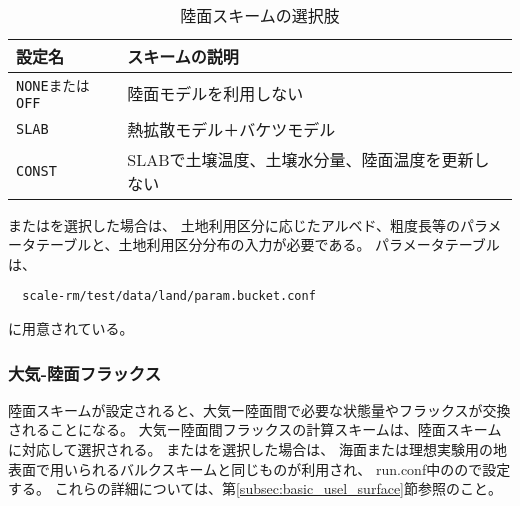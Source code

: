 \\

\begin{table}[h]
\begin{center}
  \caption{陸面スキームの選択肢}
  \label{tab:nml_land}
  \begin{tabularx}{150mm}{lX} \hline
    \rowcolor[gray]{0.9}  設定名 & スキームの説明 \\ \hline
      \verb|NONEまたはOFF| & 陸面モデルを利用しない                       \\
      \verb|SLAB|          & 熱拡散モデル＋バケツモデル                    \\
      \verb|CONST|         & SLABで土壌温度、土壌水分量、陸面温度を更新しない \\
    \hline
  \end{tabularx}
\end{center}
\end{table}


またはを選択した場合は、
土地利用区分に応じたアルベド、粗度長等のパラメータテーブルと、土地利用区分分布の入力が必要である。
パラメータテーブルは、
\begin{verbatim}
  scale-rm/test/data/land/param.bucket.conf
\end{verbatim}
に用意されている。\\


\subsubsection{大気-陸面フラックス}
陸面スキームが設定されると、大気ー陸面間で必要な状態量やフラックスが交換されることになる。
大気ー陸面間フラックスの計算スキームは、陸面スキームに対応して選択される。
またはを選択した場合は、
海面または理想実験用の地表面で用いられるバルクスキームと同じものが利用され、
run.conf中のので設定する。
これらの詳細については、第\ref{subsec:basic_usel_surface}節参照のこと。\\



